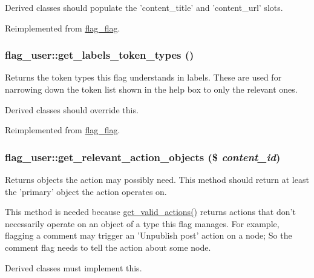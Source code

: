 Derived classes should populate the 'content\_\-title' and 'content\_\-url' slots. 

Reimplemented from \hyperlink{classflag__flag_532e58b6e71a0ef8f6bcb55607cbca8e}{flag\_\-flag}.\hypertarget{classflag__user_08790af167b1f4b273b5b8af7d3677b7}{
\subsubsection[{get\_\-labels\_\-token\_\-types}]{\setlength{\rightskip}{0pt plus 5cm}flag\_\-user::get\_\-labels\_\-token\_\-types ()}}
\label{classflag__user_08790af167b1f4b273b5b8af7d3677b7}


Returns the token types this flag understands in labels. These are used for narrowing down the token list shown in the help box to only the relevant ones.

Derived classes should override this. 

Reimplemented from \hyperlink{classflag__flag_bc21f4a879072d1a9d36b352e9ac6be0}{flag\_\-flag}.\hypertarget{classflag__user_92be6b0492226ca0feb1f2dc486d519e}{
\subsubsection[{get\_\-relevant\_\-action\_\-objects}]{\setlength{\rightskip}{0pt plus 5cm}flag\_\-user::get\_\-relevant\_\-action\_\-objects (\$ {\em content\_\-id})}}
\label{classflag__user_92be6b0492226ca0feb1f2dc486d519e}


Returns objects the action may possibly need. This method should return at least the 'primary' object the action operates on.

This method is needed because \hyperlink{group__actions_gbe1aa2bfc551fab8660cc3bacfc9d509}{get\_\-valid\_\-actions()} returns actions that don't necessarily operate on an object of a type this flag manages. For example, flagging a comment may trigger an 'Unpublish post' action on a node; So the comment flag needs to tell the action about some node.

Derived classes must implement this.

